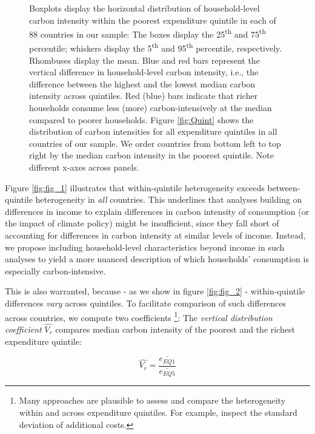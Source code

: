 \documentclass[12pt, a4paper]{article}
\newenvironment{subcaption2}
{\strut
\vspace{-5pt}
\begin{minipage}[b]{0.95\textwidth}
  \hspace*{-\parindent}
  \footnotesize}
 {\end{minipage}}
\begin{document}
\begin{figure}[ht!]
\begin{subcaption2}
    Boxplots display the horizontal distribution of household-level carbon intensity within the poorest expenditure quintile in each of 88 countries in our sample: The boxes display the 25\textsuperscript{th} and 75\textsuperscript{th} percentile; whiskers display the 5\textsuperscript{th} and 95\textsuperscript{th} percentile, respectively. Rhombuses display the mean. Blue and red bars represent the vertical difference in household-level carbon intensity, i.e., the difference between the highest and the lowest median carbon intensity across quintiles. Red (blue) bars indicate that richer households consume less (more) carbon-intensively at the median compared to poorer households. Figure \ref{fig:Quint} shows the distribution of carbon intensities for all expenditure quintiles in all countries of our sample. We order countries from bottom left to top right by the median carbon intensity in the poorest quintile. Note different x-axes across panels.
    \end{subcaption2}
\end{figure}

Figure \ref{fig:fig_1} illustrates that within-quintile heterogeneity exceeds between-quintile heterogeneity in \textit{all} countries. This underlines that analyses building on differences in income to explain differences in carbon intensity of consumption (or the impact of climate policy) might be insufficient, since they fall short of accounting for differences in carbon intensity at similar levels of income. Instead, we propose including household-level characteristics beyond income in such analyses to yield a more nuanced description of which households' consumption is especially carbon-intensive.

This is also warranted, because - as we show in figure \ref{fig:fig_2} - within-quintile differences \textit{vary} across quintiles. To facilitate comparison of such differences across countries, we compute two coefficients \autocite{Missbach.2024}\footnote{Many approaches are plausible to assess and compare the heterogeneity within and across expenditure quintiles. For example, \textcite{Cronin.2019} inspect the standard deviation of additional costs.}: The \textit{vertical distribution coefficient} $\widehat{V_{r}}$ compares median carbon intensity of the poorest and the richest expenditure quintile:

\begin{equation}
    \widehat{V_{r}} = \frac{\overline{e_{EQ1}}}{\overline{e_{EQ5}}}
\end{equation}
\end{document}
